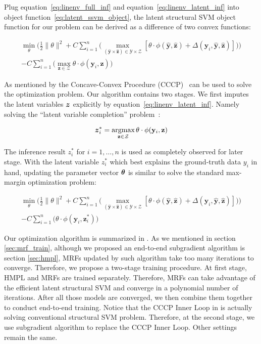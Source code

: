 \documentclass[sigconf, anonymous, review]{acmart}
\renewcommand{\citename}{\citet}
\renewcommand{\cite}{\citep}
\begin{document}
Plug equation~\eqref{eq:linenv_full_inf} and
equation~\eqref{eq:linenv_latent_inf} into object
function~\eqref{eq:latent_ssvm_object}, the latent structural SVM
object function for our problem can be derived as a difference of
two convex functions:

\begin{align}
\label{eq:lssvm_object}
  \min_\theta\bigg(\frac{1}{2}\|\theta\|^2+
  C\sum_{i=1}^{n}\big(\max_{(\mathbf{\hat{y}} \times
  \mathbf{\hat{z}}) \in \mathcal{Y} \times \mathcal{Z}}
  [\theta\cdot\phi(\mathbf{\hat{y}},\mathbf{\hat{z}}) +
  \Delta(\mathbf{y}_i,\mathbf{\hat{y}},\mathbf{\hat{z}})]\big)\bigg)\\
  -C\sum_{i=1}^{n}\big(\max_{\mathbf{z} \in \mathcal{Z}} \theta \cdot
  \phi(\mathbf{y}_i,\mathbf{z})\big)\nonumber
\end{align}

As mentioned by \citename{yu2009learning} the Concave-Convex
Procedure (CCCP)~\cite{yuille2002concave} can be used to solve the
optimization problem. Our algorithm contains two stages. We first
imputes the latent variables ${\boldsymbol{z}}$ explicitly by
equation~\eqref{eq:linenv_latent_inf}. Namely solving the
``latent variable completion'' problem~\cite{yu2009learning}:

\begin{align}
  {\boldsymbol{z}}_i^*=\mathop{\textrm{argmax}}_{\mathbf{z} \in \mathcal{Z}} \theta \cdot
  \phi(\mathbf{y}_i,\mathbf{z})
\end{align}

The inference result $z_i^*$ for $i=1,\dots,n$ is used as
completely observed for later stage. With the latent variable
$z_i^*$ which best explains the ground-truth data $y_i$ in hand,
updating the parameter vector $\boldsymbol{\theta}$ is similar to solve the
standard max-margin optimization problem:

\begin{align}
\label{eq:mrflssvm_object}
  \min_\theta\bigg(\frac{1}{2}\|\theta\|^2+
  C\sum_{i=1}^{n}\big(\max_{(\mathbf{\hat{y}} \times
  \mathbf{\hat{z}}) \in \mathcal{Y} \times \mathcal{Z}}
  [\theta\cdot\phi(\mathbf{\hat{y}},\mathbf{\hat{z}}) +
  \Delta(\mathbf{y}_i,\mathbf{\hat{y}},\mathbf{\hat{z}})]\big)\bigg)\\
  -C\sum_{i=1}^{n}\big(\theta \cdot
  \phi(\mathbf{y}_i,\mathbf{z}_i^*)\big) \nonumber
\end{align}

Our optimization algorithm is summarized in . As we mentioned
in section \ref{sec:mrf_train}, although we proposed an end-to-end subgradient algorithm
is section \ref{sec:hmpl}, MRFs updated by such algorithm take too many iterations
to converge. Therefore, we propose a two-stage training procedure. At first stage, HMPL and
MRFs are trained separately. Therefore, MRFs can take advantage of the efficient latent
structural SVM and converge in a polynomial number of iterations. After all those models
are converged, we then combine them together to conduct end-to-end training. Notice that the
CCCP Inner Loop in  is actually solving conventional structural SVM problem.
Therefore, at the second stage, we use subgradient algorithm \cite{witoonchart2017application} 
to replace the CCCP Inner Loop. Other settings remain the same.
\end{document}
